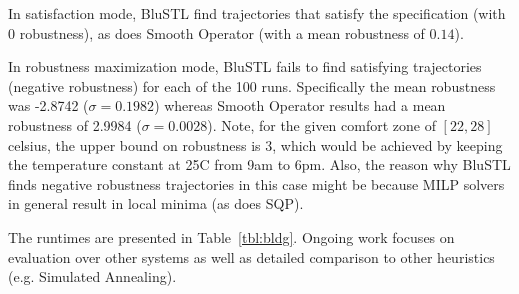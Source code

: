 In satisfaction mode, BluSTL find trajectories that satisfy the specification (with $0$ robustness), as does Smooth Operator (with a mean robustness of $0.14$).

In robustness maximization mode, BluSTL fails to find satisfying trajectories (negative robustness) for each of the 100 runs.
Specifically the mean robustness was -2.8742 ($\sigma = 0.1982$) whereas Smooth Operator results had a mean robustness of 2.9984 ($\sigma = 0.0028$). 
Note, for the given comfort zone of $[22,28]$ celsius, the upper bound on robustness is $3$, which would be achieved by keeping the temperature constant at 25C from 9am to 6pm. Also, the reason why BluSTL finds negative robustness trajectories in this case might be because MILP solvers in general result in local minima (as does SQP).

The runtimes are presented in Table~\ref{tbl:bldg}. Ongoing work focuses on evaluation over other systems as well as detailed comparison to other heuristics (e.g. Simulated Annealing). %
